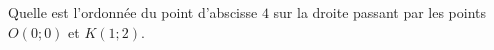 
\begin{exercice}\label{exosmath-0619}

    Quelle est l'ordonnée du point d'abscisse \( 4\) sur la droite passant par les points \( O(0;0)\) et \( K(1;2)\).

\end{exercice}
